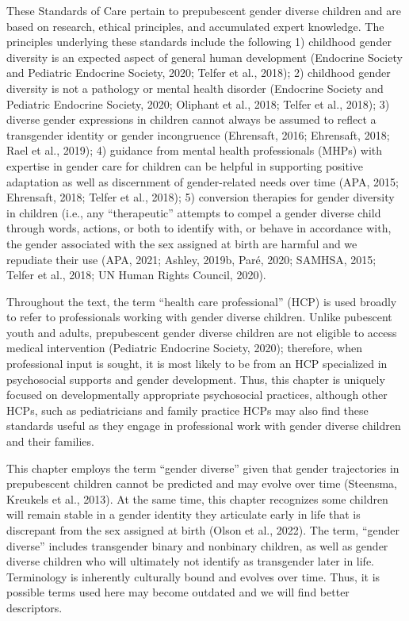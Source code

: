 \documentclass[
]{book}
\begin{document}
These Standards of Care pertain to prepubescent
gender diverse children and are based on research,
ethical principles, and accumulated expert knowledge. The principles underlying these standards
include the following 1) childhood gender diversity
is an expected aspect of general human development (Endocrine Society and Pediatric Endocrine
Society, 2020; Telfer et al., 2018); 2) childhood
gender diversity is not a pathology or mental
health disorder (Endocrine Society and Pediatric
Endocrine Society, 2020; Oliphant et al., 2018;
Telfer et al., 2018); 3) diverse gender expressions
in children cannot always be assumed to reflect a
transgender identity or gender incongruence
(Ehrensaft, 2016; Ehrensaft, 2018; Rael et al.,
2019); 4) guidance from mental health professionals (MHPs) with expertise in gender care for children can be helpful in supporting positive
adaptation as well as discernment of gender-related
needs over time (APA, 2015; Ehrensaft, 2018;
Telfer et al., 2018); 5) conversion therapies for
gender diversity in children (i.e., any ``therapeutic''
attempts to compel a gender diverse child through
words, actions, or both to identify with, or behave
in accordance with, the gender associated with the
sex assigned at birth are harmful and we repudiate
their use (APA, 2021; Ashley, 2019b, Paré, 2020;
SAMHSA, 2015; Telfer et al., 2018; UN Human
Rights Council, 2020).

Throughout the text, the term ``health care
professional'' (HCP) is used broadly to refer to
professionals working with gender diverse children. Unlike pubescent youth and adults, prepubescent gender diverse children are not eligible
to access medical intervention (Pediatric
Endocrine Society, 2020); therefore, when professional input is sought, it is most likely to be from
an HCP specialized in psychosocial supports and
gender development. Thus, this chapter is
uniquely focused on developmentally appropriate
psychosocial practices, although other HCPs, such
as pediatricians and family practice HCPs may
also find these standards useful as they engage
in professional work with gender diverse children
and their families.

This chapter employs the term ``gender diverse''
given that gender trajectories in prepubescent
children cannot be predicted and may evolve over
time (Steensma, Kreukels et al., 2013). At the
same time, this chapter recognizes some children
will remain stable in a gender identity they articulate early in life that is discrepant from the sex
assigned at birth (Olson et al., 2022). The term,
``gender diverse'' includes transgender binary and
nonbinary children, as well as gender diverse
children who will ultimately not identify as transgender later in life. Terminology is inherently
culturally bound and evolves over time. Thus, it
is possible terms used here may become outdated
and we will find better descriptors.
\end{document}
